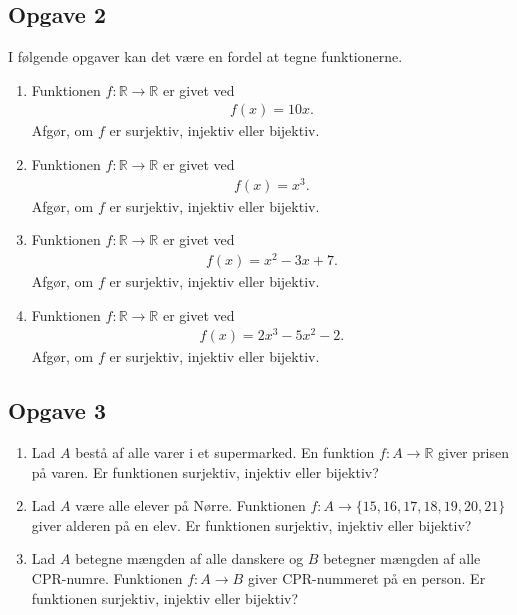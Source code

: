\subsection*{Opgave 2}
I følgende opgaver kan det være en fordel at tegne funktionerne.
\begin{enumerate}[label=\roman*)]
	\item Funktionen $f:\mathbb{R} \to \mathbb{R}$ er givet ved
	\begin{align*}
		f(x) = 10x.
	\end{align*}
	Afgør, om $f$ er surjektiv, injektiv eller bijektiv. 
	\item Funktionen $f:\mathbb{R} \to \mathbb{R}$ er givet ved
	\begin{align*}
		f(x) = x^3.
	\end{align*}
	Afgør, om $f$ er surjektiv, injektiv eller bijektiv. 
	\item Funktionen $f:\mathbb{R} \to \mathbb{R}$ er givet ved
	\begin{align*}
		f(x) = x^2-3x+7.
	\end{align*}
	Afgør, om $f$ er surjektiv, injektiv eller bijektiv. 
	\item Funktionen $f:\mathbb{R} \to \mathbb{R}$ er givet ved
	\begin{align*}
		f(x) = 2x^3-5x^2-2.
	\end{align*}
	Afgør, om $f$ er surjektiv, injektiv eller bijektiv. 
\end{enumerate}


\subsection*{Opgave 3}
\begin{enumerate}[label=\roman*)]
	\item Lad $A$ bestå af alle varer i et supermarked. En funktion $f:A \to \mathbb{R}$ giver prisen på varen. 
	Er funktionen surjektiv, injektiv eller bijektiv?
	\item Lad $A$ være alle elever på Nørre. Funktionen $f:A \to \{15,16,17,18,19,20,21\}$ giver alderen på en elev. Er funktionen surjektiv, injektiv eller bijektiv?
	\item Lad $A$ betegne mængden af alle danskere og $B$ betegner mængden af alle CPR-numre. Funktionen $f:A \to B$ giver CPR-nummeret på en person. Er funktionen surjektiv, injektiv eller bijektiv? 
\end{enumerate}

